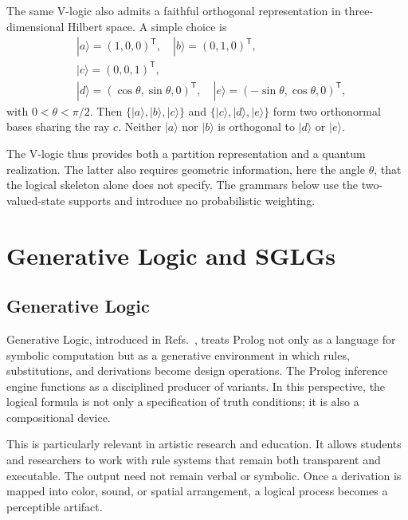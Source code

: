 \documentclass[
  10pt,
  twocolumn,
  aps,
  pra,
  showkeys,
  amsmath,amssymb,
  longbibliography
]{revtex4-2}
\begin{document}
The same V-logic also admits a faithful orthogonal representation \cite{lovasz-79,GroetschelLovaszSchrijver1986} in three-dimensional Hilbert space. A simple choice is
\begin{equation}
\begin{split}
&|a\rangle = (1,0,0)^{\mathsf T},
\quad
|b\rangle = (0,1,0)^{\mathsf T},
\\
&|c\rangle = (0,0,1)^{\mathsf T},
\\
&|d\rangle = (\cos\theta,\sin\theta,0)^{\mathsf T},
\quad
|e\rangle = (-\sin\theta,\cos\theta,0)^{\mathsf T},
\label{eq:hilbertrealization}
\end{split}
\end{equation}
with \(0<\theta<\pi/2\).
Then \(\{|a\rangle,|b\rangle,|c\rangle\}\) and \(\{|c\rangle,|d\rangle,|e\rangle\}\) form two orthonormal bases sharing the ray \(c\). Neither \(|a\rangle\) nor \(|b\rangle\) is orthogonal to \(|d\rangle\) or \(|e\rangle\).

The V-logic thus provides both a partition representation and a quantum realization. The latter also requires geometric information, here the angle \(\theta\), that the logical skeleton alone does not specify. The grammars below use the two-valued-state supports and introduce no probabilistic weighting.

\section{Generative Logic and SGLGs}

\subsection{Generative Logic}

Generative Logic, introduced in Refs.~\cite{Jendreiko2024,Jendreiko2025}, treats Prolog not only as a language for symbolic computation but as a generative environment in which rules, substitutions, and derivations become design operations. The Prolog inference engine functions as a disciplined producer of variants. In this perspective, the logical formula is not only a specification of truth conditions; it is also a compositional device.

This is particularly relevant in artistic research and education. It allows students and researchers to work with rule systems that remain both transparent and executable. The output need not remain verbal or symbolic. Once a derivation is mapped into color, sound, or spatial arrangement, a logical process becomes a perceptible artifact.
\end{document}
